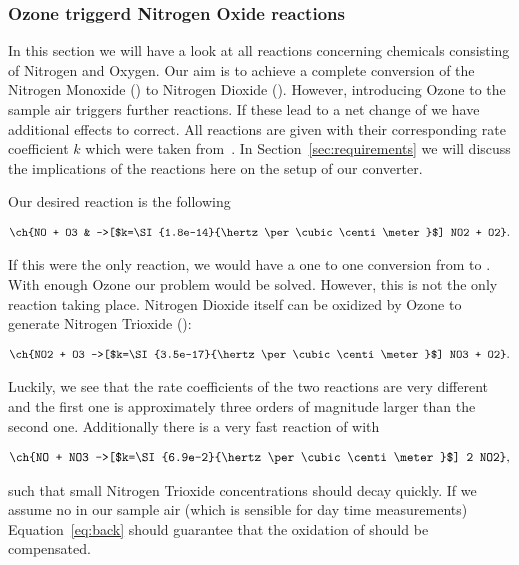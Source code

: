 \subsubsection{Ozone triggerd Nitrogen Oxide reactions}
\label{sec:o-no}

In this section we will have a look at all reactions concerning
chemicals consisting of Nitrogen and Oxygen. Our aim is to achieve a
complete conversion of the Nitrogen Monoxide () to Nitrogen
Dioxide (). However, introducing Ozone to the sample air
triggers further reactions. If these lead to a net change of 
we have additional effects to correct. All reactions are given with
their corresponding rate coefficient $k$ which were taken
from~\cite{bsc}. In Section~\ref{sec:requirements} we will discuss the
implications of the reactions here on the setup of our converter.

Our desired reaction is the following

\begin{align}
  \ch{NO + O3 & ->[$k=\SI{1.8e-14}{\hertz\per\cubic\centi\meter}$] NO2
                + O2}. \label{eq:no}
\end{align}

If this were the only reaction, we would have a one to one conversion
from  to . With enough Ozone our problem would be
solved. However, this is not the only reaction taking
place. Nitrogen Dioxide itself can be oxidized by Ozone to generate
Nitrogen Trioxide ():

\begin{align}
  \ch{NO2 + O3 ->[$k=\SI{3.5e-17}{\hertz\per\cubic\centi\meter}$] NO3
  + O2}. \label{eq:no2}
\end{align}

Luckily, we see that the rate coefficients of the two reactions are
very different and the first one is approximately three orders of
magnitude larger than the second one. Additionally there is a very
fast reaction of  with 

\begin{align}
  \ch{NO + NO3 ->[$k=\SI{6.9e-2}{\hertz\per\cubic\centi\meter}$] 2 NO2},\label{eq:back}
\end{align}

such that small Nitrogen Trioxide concentrations should decay
quickly. If we assume no  in our sample air (which is sensible
for day time measurements) Equation~\eqref{eq:back} should guarantee
that the oxidation of  should be compensated. 

